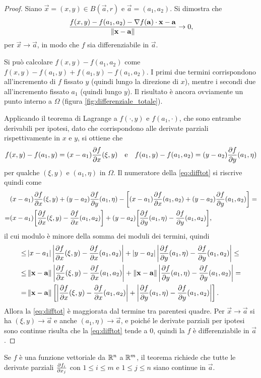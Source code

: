 \begin{proof}
	Siano $\vec x=(x,y)\in B(\vec a,r)$ e $\vec a=(a_1,a_2)$.
	Si dimostra che
	\begin{equation} \label{eq:difftot}
		\frac{f(x,y)-f(a_1,a_2)-{\nabla f(\mathbf{a})}\cdot{\mathbf{x}-\mathbf{a}}}{\left\|{\mathbf{x}-\mathbf{a}}\right\|}\to 0,
	\end{equation}
	per $\vec x\to\vec a$, in modo che $f$ sia differenziabile in $\vec a$.

	Si può calcolare $f(x,y)-f(a_1,a_2)$ come $f(x,y)-f(a_1,y)+f(a_1,y)-f(a_1,a_2)$.
	I primi due termini corrispondono all'incremento di $f$ fissato $y$ (quindi lungo la direzione di $x$), mentre i secondi due all'incremento fissato $a_1$ (quindi lungo $y$).
	Il risultato è ancora ovviamente un punto interno a $\Omega$ (figura \ref{fig:differenziale_totale}).
	
	Applicando il teorema di Lagrange a $f(\cdot,y)$ e $f(a_1,\cdot)$, che sono entrambe derivabili per ipotesi, dato che corrispondono alle derivate parziali rispettivamente in $x$ e $y$, si ottiene che
	\begin{equation}
		f(x,y)-f(a_1,y)=(x-a_1)\frac{\partial {f}}{\partial {x}}(\xi,y)\quad\text{e}\quad f(a_1,y)-f(a_1,a_2)=(y-a_2)\frac{\partial {f}}{\partial {y}}(a_1,\eta)
	\end{equation}
	per qualche $(\xi,y)$ e $(a_1,\eta)$ in $\Omega$.
	Il numeratore della \eqref{eq:difftot} si riscrive quindi come
	\begin{align*}
		&(x-a_1)\frac{\partial {f}}{\partial {x}}(\xi,y)+(y-a_2)\frac{\partial {f}}{\partial {y}}(a_1,\eta)-\bigg[(x-a_1)\frac{\partial {f}}{\partial {x}}(a_1,a_2)+(y-a_2)\frac{\partial {f}}{\partial {y}}(a_1,a_2)\bigg]=\\
		=&(x-a_1)\bigg[\frac{\partial {f}}{\partial {x}}(\xi,y)-\frac{\partial {f}}{\partial {x}}(a_1,a_2)\bigg]+(y-a_2)\bigg[\frac{\partial {f}}{\partial {y}}(a_1,\eta)-\frac{\partial {f}}{\partial {y}}(a_1,a_2)\bigg],
	\end{align*}
	il cui modulo è minore della somma dei moduli dei termini, quindi
	\begin{align*}
		\leq&\left|{x-a_1}\right|\left|{\frac{\partial {f}}{\partial {x}}(\xi,y)-\frac{\partial {f}}{\partial {x}}(a_1,a_2)}\right|+\left|{y-a_2}\right|\left|{\frac{\partial {f}}{\partial {y}}(a_1,\eta)-\frac{\partial {f}}{\partial {y}}(a_1,a_2)}\right|\leq\\
		\leq&\left\|{\mathbf{x}-\mathbf{a}}\right\|\left|{\frac{\partial {f}}{\partial {x}}(\xi,y)-\frac{\partial {f}}{\partial {x}}(a_1,a_2)}\right|+\left\|{\mathbf{x}-\mathbf{a}}\right\|\left|{\frac{\partial {f}}{\partial {y}}(a_1,\eta)-\frac{\partial {f}}{\partial {y}}(a_1,a_2)}\right|=\\
		=&\left\|{\mathbf{x}-\mathbf{a}}\right\|\left[\left|{\frac{\partial {f}}{\partial {x}}(\xi,y)-\frac{\partial {f}}{\partial {x}}(a_1,a_2)}\right|+\left|{\frac{\partial {f}}{\partial {y}}(a_1,\eta)-\frac{\partial {f}}{\partial {y}}(a_1,a_2)}\right|\right].
	\end{align*}
	Allora la \eqref{eq:difftot} è maggiorata dal termine tra parentesi quadre.
	Per $\vec x\to\vec a$ si ha $(\xi,y)\to\vec a$ e anche $(a_1,\eta)\to\vec a$, e poiché le derivate parziali per ipotesi sono continue risulta che la \eqref{eq:difftot} tende a 0, quindi la $f$ è differenziabile in $\vec a$.
\end{proof}
Se $f$ è una funzione vettoriale da $\mathbb{R}^n$ a $\mathbb{R}^m$, il teorema richiede che tutte le derivate parziali $\frac{\partial {f_i}}{\partial {x_j}}$ con $1\leq i\leq m$ e $1\leq j\leq n$ siano continue in $\vec a$.

